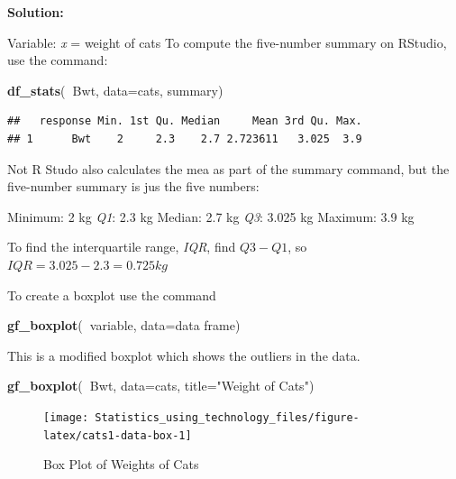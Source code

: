 \documentclass[
]{book}
\newenvironment{Shaded}{\begin{snugshade}}{\end{snugshade}}
\newcommand{\DataTypeTok}[1]{\textcolor[rgb]{0.13,0.29,0.53}{#1}}
\newcommand{\KeywordTok}[1]{\textcolor[rgb]{0.13,0.29,0.53}{\textbf{#1}}}
\newcommand{\NormalTok}[1]{#1}
\newcommand{\OperatorTok}[1]{\textcolor[rgb]{0.81,0.36,0.00}{\textbf{#1}}}
\newcommand{\StringTok}[1]{\textcolor[rgb]{0.31,0.60,0.02}{#1}}
\begin{document}
\textbf{Solution:}

Variable: \emph{x} = weight of cats
To compute the five-number summary on RStudio, use the command:

\begin{Shaded}
\begin{Highlighting}[]
\KeywordTok{df_stats}\NormalTok{(}\OperatorTok{~}\NormalTok{Bwt, }\DataTypeTok{data=}\NormalTok{cats, summary)}
\end{Highlighting}
\end{Shaded}

\begin{verbatim}
##   response Min. 1st Qu. Median     Mean 3rd Qu. Max.
## 1      Bwt    2     2.3    2.7 2.723611   3.025  3.9
\end{verbatim}

Not R Studo also calculates the mea as part of the summary command, but the five-number summary is jus the five numbers:

Minimum: 2 kg
\emph{Q1}: 2.3 kg
Median: 2.7 kg
\emph{Q3}: 3.025 kg
Maximum: 3.9 kg

To find the interquartile range, \emph{IQR}, find \(Q3-Q1\), so \(IQR=3.025-2.3=0.725 kg\)

To create a boxplot use the command

\begin{Shaded}
\begin{Highlighting}[]
\KeywordTok{gf_boxplot}\NormalTok{(}\OperatorTok{~}\NormalTok{variable, }\DataTypeTok{data=}\NormalTok{data frame)}
\end{Highlighting}
\end{Shaded}

This is a modified boxplot which shows the outliers in the data.



\begin{Shaded}
\begin{Highlighting}[]
\KeywordTok{gf_boxplot}\NormalTok{(}\OperatorTok{~}\NormalTok{Bwt, }\DataTypeTok{data=}\NormalTok{cats, }\DataTypeTok{title=}\StringTok{"Weight of Cats"}\NormalTok{)}
\end{Highlighting}
\end{Shaded}

\begin{figure}
\texttt{[image: Statistics\_using\_technology\_files/figure-latex/cats1-data-box-1]} \caption{Box Plot of Weights of Cats}\label{fig:cats1-data-box}
\end{figure}
\end{document}
